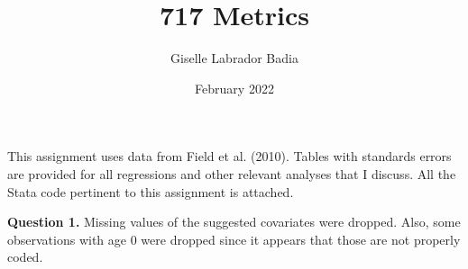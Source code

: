 \documentclass{article}
\title{717 Metrics}
\author{Giselle Labrador Badia}
\date{February 2022}
\theoremstyle{definition}
\begin{document}
\maketitle

This assignment uses data from Field et al. (2010). Tables with standards errors are provided for all regressions and other relevant analyses that I discuss. All the Stata code pertinent to this assignment is attached. 


\hspace{0.41cm} \textbf{Question 1.}  Missing values of the suggested covariates were dropped. Also, some observations with age 0 were dropped since it appears that those are not properly coded. 
\end{document}
